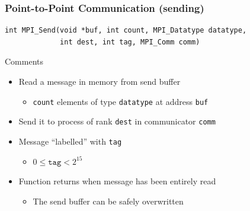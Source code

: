 \documentclass[xcolor={x11names,svgnames,psnames}]{beamer}
\begin{document}
\begin{frame}[fragile=singleslide]
  \frametitle{Point-to-Point Communication (sending)}

\begin{verbatim}
int MPI_Send(void *buf, int count, MPI_Datatype datatype,
             int dest, int tag, MPI_Comm comm)
\end{verbatim}

  \begin{block}{Comments}
    \begin{itemize}
    \item Read a message in memory from \alert{send buffer}
      \begin{itemize}
      \item \texttt{count} elements of type \texttt{datatype} at address \texttt{buf}      
      \end{itemize}
    \item Send it to process of rank \texttt{dest} in communicator \texttt{comm}
    \item Message ``labelled'' with \texttt{tag}
      \begin{itemize}
      \item $0 \leq \texttt{tag} < 2^{15}$
      \end{itemize}
    \item Function returns when message has been entirely read
      \begin{itemize}
      \item The send buffer can be safely overwritten
      \end{itemize}
    \end{itemize}
  \end{block}
\end{frame}

\end{document}
